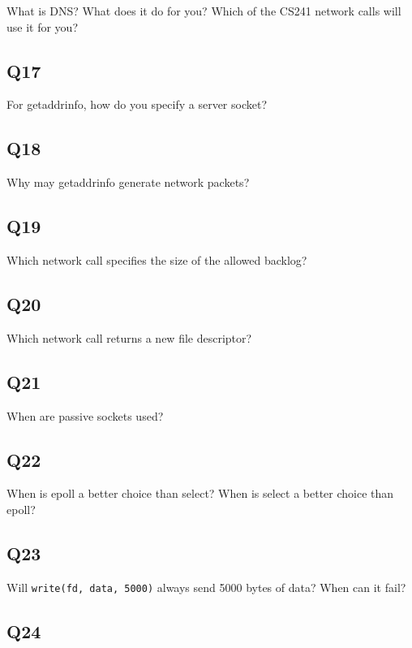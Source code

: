What is DNS? What does it do for you? Which of the CS241 network calls
will use it for you?

\subsection{Q17}\label{q17}

For getaddrinfo, how do you specify a server socket?

\subsection{Q18}\label{q18}

Why may getaddrinfo generate network packets?

\subsection{Q19}\label{q19}

Which network call specifies the size of the allowed backlog?

\subsection{Q20}\label{q20}

Which network call returns a new file descriptor?

\subsection{Q21}\label{q21}

When are passive sockets used?

\subsection{Q22}\label{q22}

When is epoll a better choice than select? When is select a better
choice than epoll?

\subsection{Q23}\label{q23}

Will \texttt{write(fd,\ data,\ 5000)} always send 5000 bytes of data?
When can it fail?

\subsection{Q24}\label{q24}

